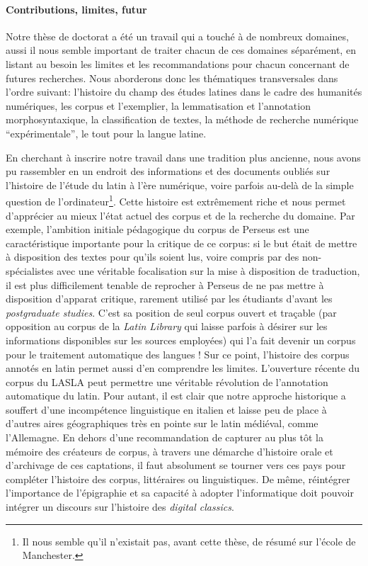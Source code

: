 \paragraph{Contributions, limites, futur}

Notre thèse de doctorat a été un travail qui a touché à de nombreux domaines, aussi il nous semble important de traiter chacun de ces domaines séparément, en listant au besoin les limites et les recommandations pour chacun concernant de futures recherches. Nous aborderons donc les thématiques transversales dans l'ordre suivant: l'histoire du champ des études latines dans le cadre des humanités numériques, les corpus et l'exemplier, la lemmatisation et l'annotation morphosyntaxique, la classification de textes, la méthode de recherche numérique \enquote{expérimentale}, le tout pour la langue latine.

En cherchant à inscrire notre travail dans une tradition plus ancienne, nous avons pu rassembler en un endroit des informations et des documents oubliés sur l'histoire de l'étude du latin à l'ère numérique, voire parfois au-delà de la simple question de l'ordinateur\footnote{Il nous semble qu'il n'existait pas, avant cette thèse, de résumé sur l'école de Manchester.}. Cette histoire est extrêmement riche et nous permet d'apprécier au mieux l'état actuel des corpus et de la recherche du domaine. Par exemple, l'ambition initiale pédagogique du corpus de Perseus est une caractéristique importante pour la critique de ce corpus: si le but était de mettre à disposition des textes pour qu'ils soient lus, voire compris par des non-spécialistes avec une véritable focalisation sur la mise à disposition de traduction, il est plus difficilement tenable de reprocher à Perseus de ne pas mettre à disposition d'apparat critique, rarement utilisé par les étudiants d'avant les \textit{postgraduate studies}. C'est sa position de seul corpus ouvert et traçable (par opposition au corpus de la \textit{Latin Library} qui laisse parfois à désirer sur les informations disponibles sur les sources employées) qui l'a fait devenir un corpus pour le traitement automatique des langues ! Sur ce point, l'histoire des corpus annotés en latin permet aussi d'en comprendre les limites. L'ouverture récente du corpus du LASLA peut permettre une véritable révolution de l'annotation automatique du latin. Pour autant, il est clair que notre approche historique a souffert d'une incompétence linguistique en italien et laisse peu de place à d'autres aires géographiques très en pointe sur le latin médiéval, comme l'Allemagne. En dehors d'une recommandation de capturer au plus tôt la mémoire des créateurs de corpus, à travers une démarche d'histoire orale et d'archivage de ces captations, il faut absolument se tourner vers ces pays pour compléter l'histoire des corpus, littéraires ou linguistiques. De même, réintégrer l'importance de l'épigraphie et sa capacité à adopter l'informatique doit pouvoir intégrer un discours sur l'histoire des \textit{digital classics}.

